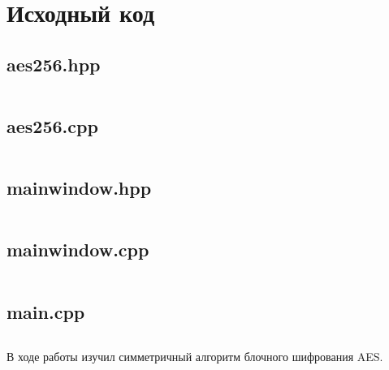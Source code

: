 \documentclass[utf8x, 14pt, bold, times]{G7-32} %
\begin{document}
\chapter{Исходный код}

\section{aes256.hpp}

\inputminted[fontsize=\footnotesize, breaklines]{cpp}{../../src/aes256.hpp}

\section{aes256.cpp}

\inputminted[fontsize=\footnotesize, breaklines]{cpp}{../../src/aes256.cpp}

\section{mainwindow.hpp}

\inputminted[fontsize=\footnotesize, breaklines]{cpp}{../../src/mainwindow.hpp}

\section{mainwindow.cpp}

\inputminted[fontsize=\footnotesize, breaklines]{cpp}{../../src/mainwindow.cpp}

\section{main.cpp}

\inputminted[fontsize=\footnotesize, breaklines]{cpp}{../../src/main.cpp}

\backmatter %

\newpage
\Conclusion

В ходе работы изучил симметричный алгоритм блочного шифрования AES.
\end{document}
